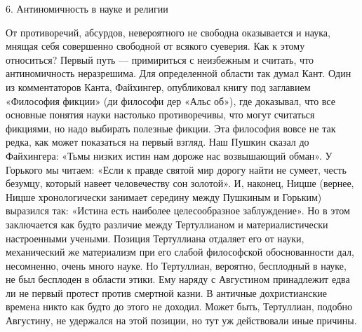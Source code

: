 6. Антиномичность в науке и религии

От  противоречий, абсурдов,  невероятного  не  свободна оказывается  и
наука, мнящая  себя совершенно  свободной от  всякого суеверия.  Как к
этому относиться? Первый путь ---  примириться с неизбежным и считать,
что  антиномичность неразрешима.  Для определенной  области так  думал
Кант.  Один  из  комментаторов  Канта,  Файхингер,  опубликовал  книгу
под  заглавием «Философия  фикции» (ди  философи дер  «Альс об»),  где
доказывал, что все основные понятия науки настолько противоречивы, что
могут  считаться  фикциями,  но  надо выбирать  полезные  фикции.  Эта
философия вовсе не  так редка, как может показаться  на первый взгляд.
Наш Пушкин  сказал до  Файхингера: «Тьмы низких  истин нам  дороже нас
возвышающий обман».  У Горького мы  читаем: «Если к правде  святой мир
дорогу найти не сумеет, честь безумцу, который навеет человечеству сон
золотой».  И, наконец,  Ницше (вернее,  Ницше хронологически  занимает
середину  между  Пушкиным  и  Горьким)  выразился  так:  «Истина  есть
наиболее целесообразное заблуждение». Но  в этом заключается как будто
различие между Тертуллианом  и материалистически настроенными учеными.
Позиция Тертуллиана отдаляет его от науки, механический же материализм
при его слабой философской обоснованности дал, несомненно, очень много
науке. Но Тертуллиан, вероятно, бесплодный в науке, не был бесплоден в
области этики. Ему  наряду с Августином принадлежит едва  ли не первый
протест против смертной казни. В античные дохристианские времена никто
как  будто  до  этого  не доходил.  Может  быть,  Тертуллиан,  подобно
Августину, не  удержался на этой  позиции, но тут уж  действовали иные
причины.

